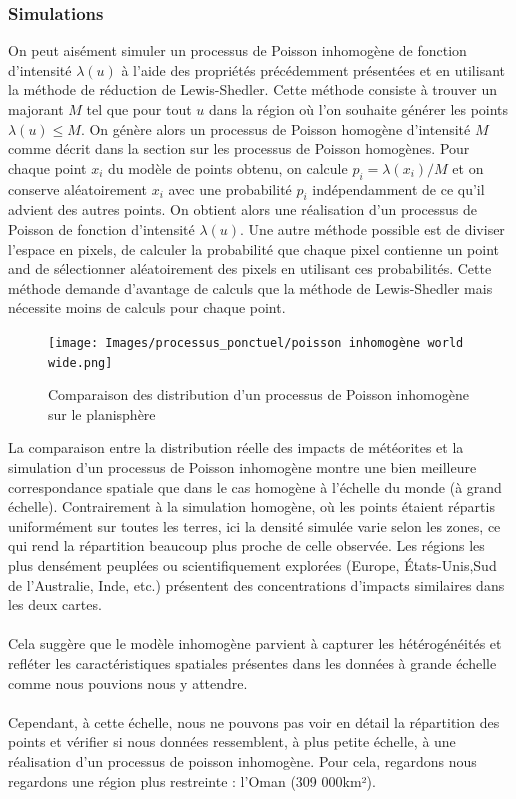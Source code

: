 \documentclass[12pt]{article}
\begin{document}
\subsubsection*{Simulations}
On peut aisément simuler un processus de Poisson inhomogène de fonction d'intensité $\lambda(u)$ à l'aide des propriétés précédemment présentées et en utilisant la méthode de réduction de Lewis-Shedler. Cette méthode consiste à trouver un majorant $M$ tel que pour tout $u$ dans la région où l'on souhaite générer les points $\lambda(u) \leq M$. On génère alors un processus de Poisson homogène d'intensité $M$ comme décrit dans la section sur les processus de Poisson homogènes. Pour chaque point $x_i$ du modèle de points obtenu, on calcule $p_i = \lambda(x_i)/M$ et on conserve aléatoirement $x_i$ avec une probabilité $p_i$ indépendamment de ce qu'il advient des autres points. On obtient alors une réalisation d'un processus de Poisson de fonction d'intensité $\lambda(u)$. Une autre méthode possible est de diviser l'espace en pixels, de calculer la probabilité que chaque pixel contienne un point and de sélectionner aléatoirement des pixels en utilisant ces probabilités. Cette méthode demande d'avantage de calculs que la méthode de Lewis-Shedler mais nécessite moins de calculs pour chaque point.
\begin{figure}[H]
    \centering
    \texttt{[image: Images/processus\_ponctuel/poisson inhomogène world wide.png]}
    \caption{Comparaison des distribution d'un processus de Poisson inhomogène sur le planisphère}
\end{figure}
La comparaison entre la distribution réelle des impacts de météorites et la simulation d’un processus de Poisson inhomogène montre une bien meilleure correspondance spatiale que dans le cas homogène à l'échelle du monde (à grand échelle). Contrairement à la simulation homogène, où les points étaient répartis uniformément sur toutes les terres, ici la densité simulée varie selon les zones, ce qui rend la répartition beaucoup plus proche de celle observée. Les régions les plus densément peuplées ou scientifiquement explorées (Europe, États-Unis,Sud de l'Australie, Inde, etc.) présentent des concentrations d’impacts similaires dans les deux cartes.\\
\\
Cela suggère que le modèle inhomogène parvient à capturer les hétérogénéités et refléter les caractéristiques spatiales présentes dans les données à grande échelle comme nous pouvions nous y attendre.\\
\\
Cependant, à cette échelle, nous ne pouvons pas voir en détail la répartition des points et vérifier si nous données ressemblent, à plus petite échelle, à une réalisation d'un processus de poisson inhomogène. Pour cela, regardons nous regardons une région plus restreinte : l'Oman (309 000km²).\\
\end{document}
